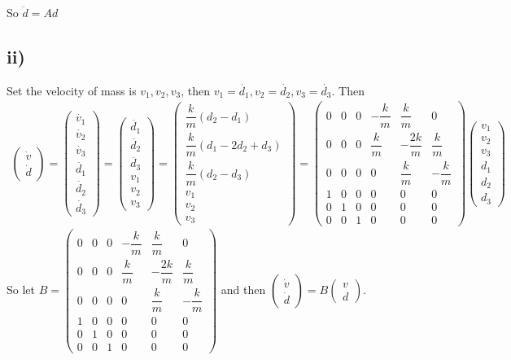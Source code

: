 \documentclass[a4paper,12pt,titlepage]{article}
\begin{document}
So $\ddot{d}=Ad$
\subsection*{ii)}
Set the velocity of mass is $v_1,v_2,v_3$, then $v_1=\dot{d_1},v_2=\dot{d_2},v_3=\dot{d_3}$. Then
\begin{align*}
\begin{pmatrix}
\dot{v}\\
\dot{d}
\end{pmatrix}=\begin{pmatrix}
\dot{v_1}\\
\dot{v_2}\\
\dot{v_3}\\
\dot{d_1}\\
\dot{d_2}\\
\dot{d_3}
\end{pmatrix}=\begin{pmatrix}
\ddot{d_1}\\
\ddot{d_2}\\
\ddot{d_3}\\
v_1\\
v_2\\
v_3
\end{pmatrix}=\begin{pmatrix}
\dfrac{k}{m}(d_2-d_1)\\
\dfrac{k}{m}(d_1-2d_2+d_3)\\
\dfrac{k}{m}(d_2-d_3)\\
v_1\\
v_2\\
v_3
\end{pmatrix}=\begin{pmatrix}
0&0&0&-\dfrac{k}{m}&\dfrac{k}{m}&0\\
0&0&0&\dfrac{k}{m}&-\dfrac{2k}{m}&\dfrac{k}{m}\\
0&0&0&0&\dfrac{k}{m}&-\dfrac{k}{m}\\
1&0&0&0&0&0\\
0&1&0&0&0&0\\
0&0&1&0&0&0
\end{pmatrix}\begin{pmatrix}
v_1\\
v_2\\
v_3\\
d_1\\
d_2\\
d_3
\end{pmatrix}
\end{align*}
So let $B=\begin{pmatrix}
0&0&0&-\dfrac{k}{m}&\dfrac{k}{m}&0\\
0&0&0&\dfrac{k}{m}&-\dfrac{2k}{m}&\dfrac{k}{m}\\
0&0&0&0&\dfrac{k}{m}&-\dfrac{k}{m}\\
1&0&0&0&0&0\\
0&1&0&0&0&0\\
0&0&1&0&0&0
\end{pmatrix}$ and then $\begin{pmatrix}
\dot{v}\\
\dot{d}
\end{pmatrix}=B\begin{pmatrix}
v\\
d
\end{pmatrix}$.
\end{document}
